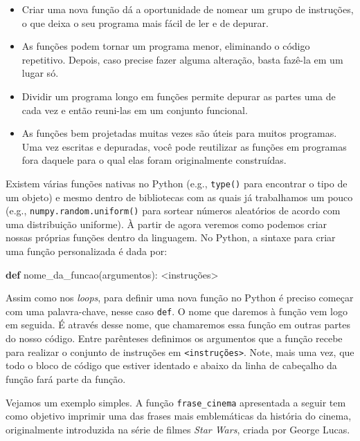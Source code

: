 \documentclass[
  brazilian,
  letterpaper,
  DIV=11,
  numbers=noendperiod]{scrreprt}
\newenvironment{Shaded}{\begin{snugshade}}{\end{snugshade}}
\newcommand{\KeywordTok}[1]{\textcolor[rgb]{0.00,0.23,0.31}{\textbf{#1}}}
\newcommand{\NormalTok}[1]{\textcolor[rgb]{0.00,0.23,0.31}{#1}}
\newcommand{\OperatorTok}[1]{\textcolor[rgb]{0.37,0.37,0.37}{#1}}
\begin{document}
\begin{itemize}
\item
  Criar uma nova função dá a oportunidade de nomear um grupo de
  instruções, o que deixa o seu programa mais fácil de ler e de depurar.
\item
  As funções podem tornar um programa menor, eliminando o código
  repetitivo. Depois, caso precise fazer alguma alteração, basta fazê-la
  em um lugar só.
\item
  Dividir um programa longo em funções permite depurar as partes uma de
  cada vez e então reuni-las em um conjunto funcional.
\item
  As funções bem projetadas muitas vezes são úteis para muitos
  programas. Uma vez escritas e depuradas, você pode reutilizar as
  funções em programas fora daquele para o qual elas foram originalmente
  construídas.
\end{itemize}

Existem várias funções nativas no Python (e.g., \texttt{type()} para
encontrar o tipo de um objeto) e mesmo dentro de bibliotecas com as
quais já trabalhamos um pouco (e.g., \texttt{numpy.random.uniform()}
para sortear números aleatórios de acordo com uma distribuição
uniforme). À partir de agora veremos como podemos criar nossas próprias
funções dentro da linguagem. No Python, a sintaxe para criar uma função
personalizada é dada por:

\begin{Shaded}
\begin{Highlighting}[]
\KeywordTok{def}\NormalTok{ nome\_da\_funcao(argumentos):}
    \OperatorTok{\textless{}}\NormalTok{instruções}\OperatorTok{\textgreater{}}    
\end{Highlighting}
\end{Shaded}

Assim como nos \emph{loops}, para definir uma nova função no Python é
preciso começar com uma palavra-chave, nesse caso \texttt{def}. O nome
que daremos à função vem logo em seguida. É através desse nome, que
chamaremos essa função em outras partes do nosso código. Entre
parênteses definimos os argumentos que a função recebe para realizar o
conjunto de instruções em \texttt{\textless{}instruções\textgreater{}}.
Note, mais uma vez, que todo o bloco de código que estiver identado e
abaixo da linha de cabeçalho da função fará parte da função.

Vejamos um exemplo simples. A função \texttt{frase\_cinema} apresentada
a seguir tem como objetivo imprimir uma das frases mais emblemáticas da
história do cinema, originalmente introduzida na série de filmes
\emph{Star Wars}, criada por George Lucas.
\end{document}

